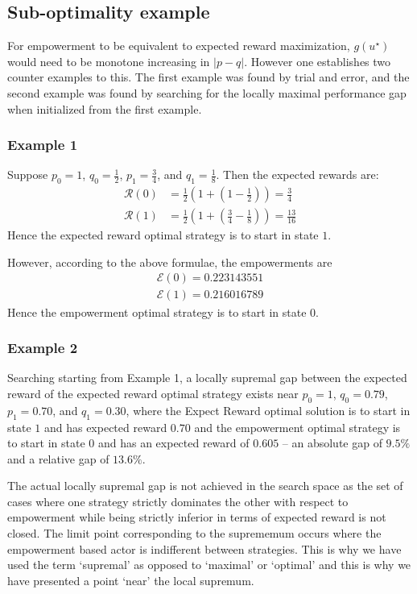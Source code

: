 \documentclass{article}
\newcommand{\Ee}{\mathcal{E}}
\newcommand{\Rr}{\mathcal{R}}
\begin{document}
\subsection{Sub-optimality example}
For empowerment to be equivalent to expected reward maximization, $g(u^\star)$ would need to be monotone increasing in $|p-q|$. However one establishes two counter examples to this. The first example was found by trial and error, and the second example was found by searching for the locally maximal performance gap when initialized from the first example. 

\subsubsection{Example 1}
Suppose $p_0=1$, $q_0=\frac{1}{2}$, $p_1=\frac{3}{4}$, and $q_1 = \frac{1}{8}$. Then the expected rewards are:
\begin{align*}
\Rr(0) &= \frac{1}{2}\left(1+\left(1-\frac{1}{2}\right)\right)=\frac{3}{4}\\
\Rr(1) &= \frac{1}{2}\left(1+\left(\frac{3}{4}-\frac{1}{8}\right)\right)=\frac{13}{16}
\end{align*}
Hence the expected reward optimal strategy is to start in state $1$.

However, according to the above formulae, the empowerments are
\begin{align*}
\Ee(0)=0.223143551\\
\Ee(1)=0.216016789 
\end{align*}
Hence the empowerment optimal strategy is to start in state $0$.

\subsubsection{Example 2}
Searching starting from Example 1, a locally supremal gap between the expected reward of the expected reward optimal strategy exists near $p_0=1$, $q_0=0.79$, $p_1=0.70$, and $q_1 = 0.30$, where the Expect Reward optimal solution is to start in state $1$ and has expected reward $0.70$ and the empowerment optimal strategy is to start in state $0$ and has an expected reward of $0.605$ -- an absolute gap of $9.5\%$ and a relative gap of $13.6\%$. 

The actual locally supremal gap is not achieved in the search space as the set of cases where one strategy strictly dominates the other with respect to empowerment while being strictly inferior in terms of expected reward is not closed. The limit point corresponding to the suprememum occurs where the empowerment based actor is indifferent between strategies. This is why we have used the term `supremal' as opposed to `maximal' or `optimal' and this is why we have presented a point `near' the local supremum.
\end{document}
